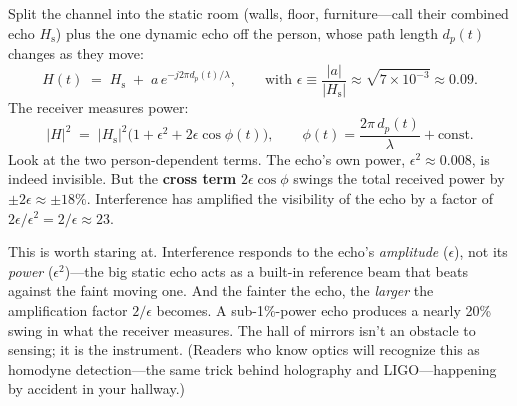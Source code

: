 \documentclass[11pt, letterpaper]{article}
\newcommand{\Hs}{H_{\mathrm{s}}}
\begin{document}
Split the channel into the static room (walls, floor, furniture---call their combined echo $\Hs$) plus the one dynamic echo off the person, whose path length $d_p(t)$ changes as they move:
\begin{equation}
  H(t) \;=\; \Hs \;+\; a\, e^{-j 2\pi d_p(t)/\lambda},
  \qquad \text{with } \epsilon \equiv \frac{|a|}{|\Hs|} \approx \sqrt{7\times10^{-3}} \approx 0.09 .
\end{equation}
The receiver measures power:
\begin{equation}
  |H|^2 \;=\; |\Hs|^2 \Big( 1 + \epsilon^2 + 2\epsilon \cos\phi(t) \Big),
  \qquad \phi(t) = \frac{2\pi\, d_p(t)}{\lambda} + \text{const}.
  \label{eq:crossterm}
\end{equation}
Look at the two person-dependent terms. The echo's own power, $\epsilon^2 \approx 0.008$, is indeed invisible. But the \textbf{cross term} $2\epsilon\cos\phi$ swings the total received power by $\pm 2\epsilon \approx \pm 18\%$. Interference has amplified the visibility of the echo by a factor of $2\epsilon / \epsilon^2 = 2/\epsilon \approx 23$.

This is worth staring at. Interference responds to the echo's \textit{amplitude} ($\epsilon$), not its \textit{power} ($\epsilon^2$)---the big static echo acts as a built-in reference beam that beats against the faint moving one. And the fainter the echo, the \textit{larger} the amplification factor $2/\epsilon$ becomes. A sub-1\%-power echo produces a nearly 20\% swing in what the receiver measures. The hall of mirrors isn't an obstacle to sensing; it is the instrument. (Readers who know optics will recognize this as homodyne detection---the same trick behind holography and LIGO---happening by accident in your hallway.)
\end{document}
